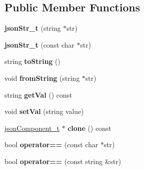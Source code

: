 \subsection*{\-Public \-Member \-Functions}
\begin{DoxyCompactItemize}
\item 
\hypertarget{classjsonStr__t_ac5da45042f8cd5e048e5e10a502a0fd0}{{\bfseries json\-Str\-\_\-t} (string $\ast$str)}\label{classjsonStr__t_ac5da45042f8cd5e048e5e10a502a0fd0}

\item 
\hypertarget{classjsonStr__t_a157b841c77e886d9f56944caa3d7c8e2}{{\bfseries json\-Str\-\_\-t} (const char $\ast$str)}\label{classjsonStr__t_a157b841c77e886d9f56944caa3d7c8e2}

\item 
\hypertarget{classjsonStr__t_a904244aba3fa26e973ec6f8b715a797d}{string {\bfseries to\-String} ()}\label{classjsonStr__t_a904244aba3fa26e973ec6f8b715a797d}

\item 
\hypertarget{classjsonStr__t_a716dea12747d9965e8e887f21bb3dc8c}{void {\bfseries from\-String} (string $\ast$str)}\label{classjsonStr__t_a716dea12747d9965e8e887f21bb3dc8c}

\item 
\hypertarget{classjsonStr__t_ac456c858b1becdeebe116e0dd98349dc}{string {\bfseries get\-Val} () const }\label{classjsonStr__t_ac456c858b1becdeebe116e0dd98349dc}

\item 
\hypertarget{classjsonStr__t_aa625115af12132627820c6babd7f7ef2}{void {\bfseries set\-Val} (string value)}\label{classjsonStr__t_aa625115af12132627820c6babd7f7ef2}

\item 
\hypertarget{classjsonStr__t_a9317dbdd5d1faa80f87bf929db90195b}{\hyperlink{classjsonComponent__t}{json\-Component\-\_\-t} $\ast$ {\bfseries clone} () const }\label{classjsonStr__t_a9317dbdd5d1faa80f87bf929db90195b}

\item 
\hypertarget{classjsonStr__t_a53c0ad75561f3e9cc3e1aace1d5c7c72}{bool {\bfseries operator==} (const char $\ast$str)}\label{classjsonStr__t_a53c0ad75561f3e9cc3e1aace1d5c7c72}

\item 
\hypertarget{classjsonStr__t_ad01faf8ad3ca5249521d069aa805e339}{bool {\bfseries operator==} (const string \&str)}\label{classjsonStr__t_ad01faf8ad3ca5249521d069aa805e339}


\end{DoxyCompactItemize}
